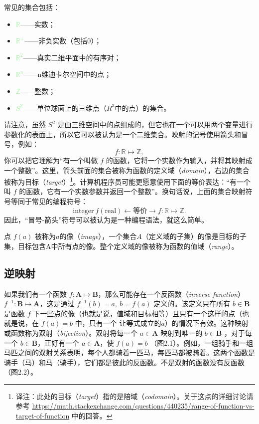 常见的集合包括：
\begin{itemize}
  \item \textcolor{lightgreen}{$\mathbb{R}$}——实数；
  \item \textcolor{lightgreen}{$\mathbb{R^+}$}——非负实数（包括0）；
  \item \textcolor{lightgreen}{$\mathbb{R}^2$}——真实二维平面中的有序对；
  \item \textcolor{lightgreen}{$\mathbb{R}^n$}——n维迪卡尔空间中的点；
  \item \textcolor{lightgreen}{$\mathbb{Z}$}——整数；
  \item \textcolor{lightgreen}{$S^2$}——单位球面上的三维点（$R^3$中的点）的集合。
\end{itemize}
请注意，虽然 $S^2$ 是由三维空间中的点组成的，但它也在一个可以用两个变量进行参数化的表面上，所以它可以被认为是一个二维集合。映射的记号使用箭头和冒号，例如：
\[
  f : \mathbb{R} \mapsto \mathbb{Z},
\]
你可以把它理解为“有一个叫做 $f$ 的函数，它将一个实数作为输入，并将其映射成一个整数”。这里，箭头前面的集合被称为函数的定义域（\textit{domain}），右边的集合被称为目标（\textit{target}）\footnote[1]{译注：此处的目标（\textit{target}）指的是陪域（\textit{codomain}）。关于这点的详细讨论请参考 \url{https://math.stackexchange.com/questions/440235/range-of-function-vs-target-of-function} 中的回答。}。计算机程序员可能更愿意使用下面的等价表达：“有一个叫 $f$ 的函数，它有一个实数参数并返回一个整数”。换句话说，上面的集合映射符号等同于常见的编程符号：
\[
  \text{integer} \ f(\text{real}) \leftarrow \text{等价} \rightarrow f : \mathbb{R} \mapsto \mathbb{Z}.
\]
因此，“冒号-箭头”符号可以被认为是一种编程语法，就这么简单。

点 $f(a)$ 被称为$a$的像（\textit{image}），一个集合$A$（定义域的子集）的像是目标的子集，目标包含A中所有点的像。整个定义域的像被称为函数的值域（\textit{range}）。

\subsection{逆映射}


如果我们有一个函数 $f : \textbf{A} \mapsto \textbf{B}$，那么可能存在一个反函数（\textit{inverse function}） $f^{-1} : \textbf{B} \mapsto \textbf{A}$，这是通过 $ f^{-1}(b) = a,\ b = f(a)$ 定义的。该定义只在所有 $b \in \textbf{B}$是函数 $f$ 下一些点的像（也就是说，值域和目标相等）且只有一个这样的点（也就是说，在 $f(a) = b$ 中，只有一个 让等式成立的$a$）的情况下有效。这种映射或函数称为双射（\textit{bijection}）。双射将每一个 $a \in \textbf{A}$ 映射到唯一的 $b \in \textbf{B}$ ，对于每一个 $b \in \textbf{B}$，正好有一个 $a \in \textbf{A}$，使 $f(a)=b$ （图2.1）。例如，一组骑手和一组马匹之间的双射关系表明，每个人都骑着一匹马，每匹马都被骑着。这两个函数是骑手（马）和马（骑手），它们都是彼此的反函数。不是双射的函数没有反函数（图2.2）。

